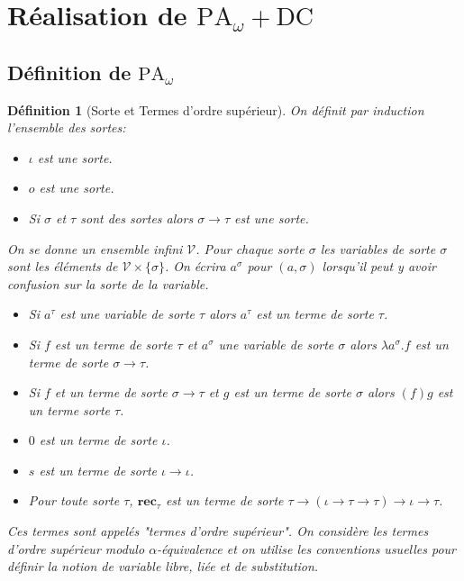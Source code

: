 \documentclass[a4paper,12pt]{article}
\newtheorem{defi}[theo]{Définition}
\theoremstyle{rmqstyle}
\newcommand{\set}[1]{\{#1\}}
\newcommand{\PA}{\mathrm{PA}}
\newcommand{\rec}{\mathbf{rec}}
\newcommand{\DC}{\mathrm{DC}}
\begin{document}
\clearpage

\section{Réalisation de \( \PA_\omega +  \DC\)}
\label{sec 2}

\subsection{Définition de \( \PA_\omega \)}

\begin{defi}[Sorte et Termes d'ordre supérieur]
On définit par induction l'ensemble des sortes:
\begin{itemize}
\setlength\itemsep{ -1 em}
\item $\iota$ est une sorte.\\
\item $o$ est une sorte.\\
\item Si $\sigma$ et $\tau$ sont des sortes alors $\sigma \to \tau$ est une sorte.
\end{itemize}
On se donne un ensemble infini $\mathcal{V}$. Pour chaque sorte $\sigma$ les variables de sorte $\sigma$ sont les éléments de $\mathcal{V} \times \set{\sigma}$. On écrira $a^\sigma$ pour $(a, \sigma)$ lorsqu'il peut y avoir confusion sur la sorte de la variable. 
\begin{itemize}
\setlength\itemsep{ -1 em}
\item Si $a^\tau$ est une variable de sorte $\tau$ alors $a^\tau$ est un terme de sorte $\tau$.\\
\item Si $f$ est un terme de sorte $\tau$ et $a^\sigma$ une variable de sorte $\sigma$ alors $\lambda a^\sigma. f$ est un terme de sorte $\sigma \to \tau$.\\
\item Si $f$ et un terme de sorte $\sigma \to \tau$ et $g$ est un terme de sorte $\sigma$ alors $(f)g$ est un terme sorte $\tau$.\\
\item $0$ est un terme de sorte $\iota$.\\
\item $s$ est un terme de sorte $\iota \to \iota$.\\
\item Pour toute sorte $\tau$, $\rec_\tau$ est un terme de sorte $\tau \to ( \iota \to \tau \to \tau) \to \iota \to \tau$.
\end{itemize}
Ces termes sont appelés "termes d'ordre supérieur". On considère les termes d'ordre supérieur modulo $\alpha$-équivalence et on utilise les conventions usuelles pour définir la notion de variable libre, liée et de substitution. 
\end{defi}
\end{document}
